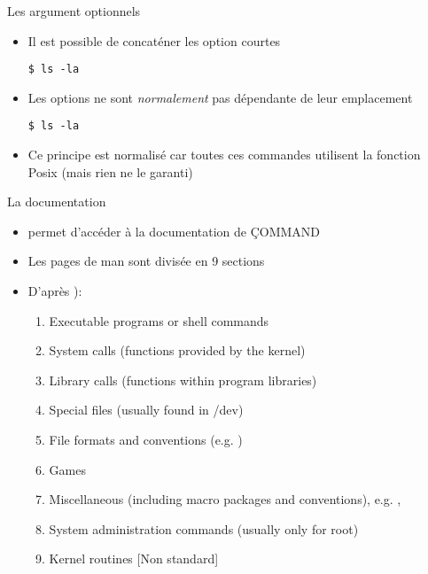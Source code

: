 \begin{frame}[fragile=singleslide]{Les argument optionnels}
  \begin{itemize}
  \item Il est possible de concaténer les option courtes
    \begin{lstlisting}
$ ls -la
    \end{lstlisting} %
  \item Les options ne  sont \emph{normalement} pas dépendante de leur
    emplacement
    \begin{lstlisting}
$ ls -la
    \end{lstlisting} %
  \item Ce  principe est normalisé car toutes  ces commandes utilisent
    la fonction Posix  (mais rien ne le garanti)
  \end{itemize}
\end{frame}

\begin{frame}[fragile=singleslide]{La documentation}
  \begin{itemize}
  \item  {} permet  d'accéder  à  la documentation  de
    \c{COMMAND}
  \item  Les  pages  de  man  sont  divisée  en  9  sections
  \item D'après ):
    \begin{enumerate}
    \item Executable programs or shell commands
    \item System calls (functions provided by the kernel)
    \item Library calls (functions within program libraries)
    \item Special files (usually found in /dev)
    \item File formats and conventions (e.g. )
    \item Games
    \item  Miscellaneous (including  macro packages  and conventions),
      e.g.  , 
    \item System administration commands (usually only for root)
    \item Kernel routines [Non standard]
    \end{enumerate}
  \end{itemize}
\end{frame}

